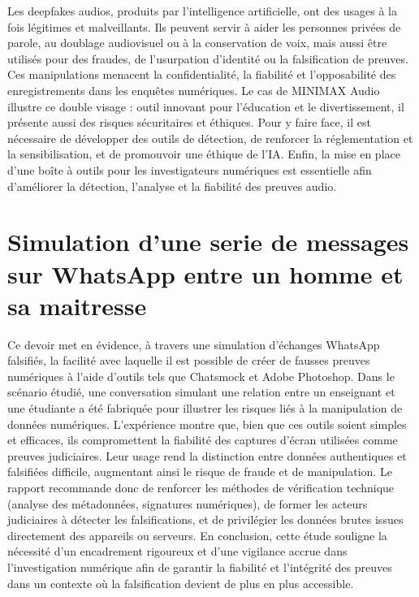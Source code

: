 \documentclass[memoire, 12pt]{report}
\begin{document}
Les deepfakes audios, produits par l’intelligence artificielle, ont des usages à la fois légitimes et malveillants. Ils peuvent servir à aider les personnes privées de parole, au doublage audiovisuel ou à la conservation de voix, mais aussi être utilisés pour des fraudes, de l’usurpation d’identité ou la falsification de preuves. Ces manipulations menacent la confidentialité, la fiabilité et l’opposabilité des enregistrements dans les enquêtes numériques. Le cas de MINIMAX Audio illustre ce double visage : outil innovant pour l’éducation et le divertissement, il présente aussi des risques sécuritaires et éthiques. Pour y faire face, il est nécessaire de développer des outils de détection, de renforcer la réglementation et la sensibilisation, et de promouvoir une éthique de l’IA. Enfin, la mise en place d’une boîte à outils pour les investigateurs numériques est essentielle afin d’améliorer la détection, l’analyse et la fiabilité des preuves audio.


\section{Simulation d'une serie de messages sur
WhatsApp entre un homme et sa maitresse}

Ce devoir met en évidence, à travers une simulation d’échanges WhatsApp falsifiés, la facilité avec laquelle il est possible de créer de fausses preuves numériques à l’aide d’outils tels que Chatsmock et Adobe Photoshop. Dans le scénario étudié, une conversation simulant une relation entre un enseignant et une étudiante a été fabriquée pour illustrer les risques liés à la manipulation de données numériques. L’expérience montre que, bien que ces outils soient simples et efficaces, ils compromettent la fiabilité des captures d’écran utilisées comme preuves judiciaires. Leur usage rend la distinction entre données authentiques et falsifiées difficile, augmentant ainsi le risque de fraude et de manipulation. Le rapport recommande donc de renforcer les méthodes de vérification technique (analyse des métadonnées, signatures numériques), de former les acteurs judiciaires à détecter les falsifications, et de privilégier les données brutes issues directement des appareils ou serveurs. En conclusion, cette étude souligne la nécessité d’un encadrement rigoureux et d’une vigilance accrue dans l’investigation numérique afin de garantir la fiabilité et l’intégrité des preuves dans un contexte où la falsification devient de plus en plus accessible.
\end{document}
